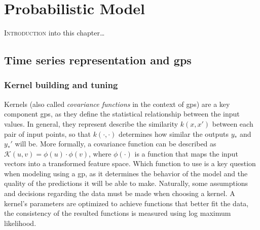 \chapter{Probabilistic Model}
\label{chap:statistical_model}

\lettrine{I}{ntroduction} into this chapter\dots

\pagebreak

\section{Time series representation and \aclp{gp}}
\label{sec:time_series_analysis}


\subsection{Kernel building and tuning}
\label{subsec:covariance_functions}


Kernels (also called \textit{covariance functions} in the context of \acp{gp}) are a key component \acp{gp}, as they define the statistical relationship between the input values.
In general, they represent describe the similarity $k(x, x')$ between each pair of input points, so that $k(\cdot, \cdot)$ determines how similar the outputs $y_*$ and $y_*'$ will be. 
More formally, a covariance function can be described as $\mathcal{K}(u, v) = \phi(u) \cdot \phi(v)$, where $\phi(\cdot)$ is a function that maps the input vectors into a transformed feature space.
Which function to use is a key question when modeling using a \ac{gp}, as it determines the behavior of the model and the quality of the predictions it will be able to make.
Naturally, some assumptions and decisions regarding the data must be made when choosing a kernel.
A kernel's parameters are optimized to achieve functions that better fit the data, the consistency of the resulted functions is measured using log maximum likelihood.

